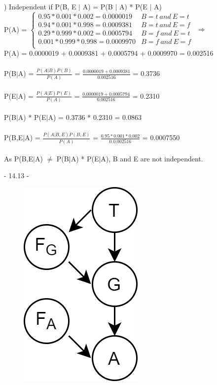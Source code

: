 \documentclass[12pt]{article}
\begin{document}
) Independent if P(B, E $|$ A) = P(B $|$ A) * P(E $|$ A)\\[.4em]
\indent P(A) = $
\begin{cases}
0.95 * 0.001 * 0.002 = 0.0000019 & B=t\ and\ E=t \\
0.94 * 0.001 * 0.998 = 0.0009381 & B=t\ and\ E=f \\
0.29 * 0.999 * 0.002 = 0.0005794 & B=f\ and\ E=t \\
0.001 * 0.999 * 0.998 = 0.0009970 & B=f\ and\ E=f \\
\end{cases}$ $\Rightarrow$\\[.4em]
\indent P(A) = 0.0000019 + 0.0009381 + 0.0005794 + 0.0009970 = 0.002516\\\\
\indent P(B$|$A) = {\Large $\frac{P(A|B)P(B)}{P(A)}$} = {\Large $\frac{0.0000019 + 0.0009381}{0.002516}$} = 0.3736\\\\
\indent P(E$|$A) = {\Large $\frac{P(A|E)P(E)}{P(A)}$} = {\Large $\frac{0.0000019 + 0.0005794}{0.002516}$} = 0.2310\\\\
\indent P(B$|$A) * P(E$|$A) = 0.3736 * 0.2310 = 0.0863\\\\
\indent P(B,E$|$A) = {\Large $\frac{P(A|B,E)P(B,E)}{P(A)}$} = {\Large $\frac{0.95 * 0.001 * 0.002}{0.0.002516}$} = 0.0007550\\\\
\indent As P(B,E$|$A) $\neq$ P(B$|$A) * P(E$|$A), B and E are not independent.\\



\noindent \hrulefill \pagebreak



\centerline{- 14.13 - }
\begin{figure}[h!]
  \centering
  \includegraphics[scale=.5]{pics/Q14-13.png}
\end{figure}
\end{document}
